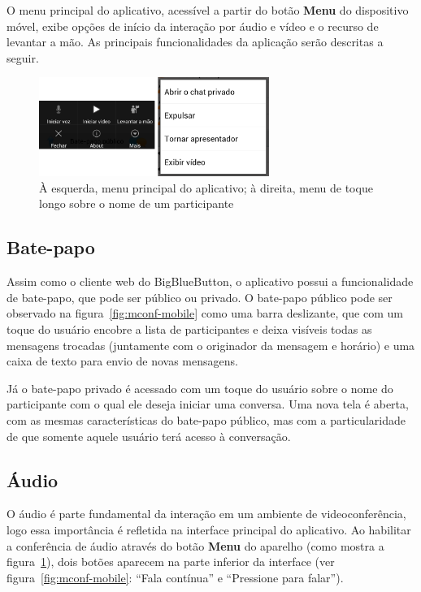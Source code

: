 \documentclass{acm_proc_article-sp}
\begin{document}
O menu principal do aplicativo, acessível a partir do botão \textbf{Menu} do dispositivo móvel, exibe opções de início da interação por áudio e vídeo e o recurso de levantar a mão. As principais funcionalidades da aplicação serão descritas a seguir.

\begin{figure}[htp]
\centering
\includegraphics[width=75mm]{menu_merged.png}
\caption{À esquerda, menu principal do aplicativo; à direita, menu de toque longo sobre o nome de um participante}\label{fig:menu}
\end{figure}

\subsection{Bate-papo}

Assim como o cliente web do BigBlueButton, o aplicativo possui a funcionalidade de bate-papo, que pode ser público ou privado. O bate-papo público pode ser observado na figura~\ref{fig:mconf-mobile} como uma barra deslizante, que com um toque do usuário encobre a lista de participantes e deixa visíveis todas as mensagens trocadas (juntamente com o originador da mensagem e horário) e uma caixa de texto para envio de novas mensagens.

Já o bate-papo privado é acessado com um toque do usuário sobre o nome do participante com o qual ele deseja iniciar uma conversa. Uma nova tela é aberta, com as mesmas características do bate-papo público, mas com a particularidade de que somente aquele usuário terá acesso à conversação.

\subsection{Áudio}

O áudio é parte fundamental da interação em um ambiente de videoconferência, logo essa importância é refletida na interface principal do aplicativo. Ao habilitar a conferência de áudio através do botão \textbf{Menu} do aparelho (como mostra a figura~\ref{fig:menu}), dois botões aparecem na parte inferior da interface (ver figura~\ref{fig:mconf-mobile}: ``Fala contínua'' e ``Pressione para falar'').
\end{document}
